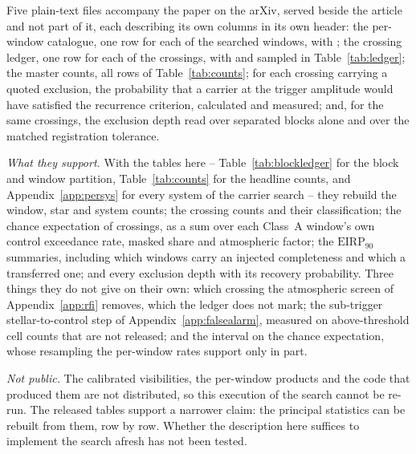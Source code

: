 Five plain-text files accompany the paper on the arXiv, served beside the
article and not part of it, each describing its own columns in its own header:
the per-window catalogue, one row for each of the \NWindows{} searched windows,
with \SiCatColList; the crossing ledger, one row for each of the
\EvNCrossRaw{} crossings, with \SiLdgColList{} and sampled in
Table~\ref{tab:ledger}; the master counts, all
\MtCountRows{} rows of Table~\ref{tab:counts}; for each crossing carrying
a quoted exclusion, the probability that a carrier at the trigger amplitude
would have satisfied the recurrence criterion, calculated and measured; and,
for the same crossings, the exclusion depth read over separated blocks alone
and over the matched registration tolerance.

\emph{What they support.} With the tables here -- Table~\ref{tab:blockledger}
for the block and window partition, Table~\ref{tab:counts} for the headline
counts, and Appendix~\ref{app:persys} for every system of the carrier search
-- they rebuild the window, star
and system counts; the crossing counts and their classification; the chance
expectation of \CeExp{} crossings, as a sum over each Class~A window's own
control exceedance rate, masked share and atmospheric factor; the
$\mathrm{EIRP}_{90}$ summaries, including which windows carry an injected
completeness and which a transferred one; and every exclusion depth with its
recovery probability. Three things they do not give on their own: which
crossing the atmospheric screen of Appendix~\ref{app:rfi} removes, which the
ledger does not mark; the sub-trigger stellar-to-control step of
Appendix~\ref{app:falsealarm}, measured on above-threshold cell counts that are
not released; and the interval on the chance expectation, whose resampling the
per-window rates support only in part.

\emph{Not public.} The calibrated visibilities, the per-window products and the
code that produced them are not distributed, so this execution of the search
cannot be re-run. The released tables support a narrower claim: the
principal statistics can be rebuilt from them, row by row. Whether the
description here suffices to implement the search afresh has not been tested.
